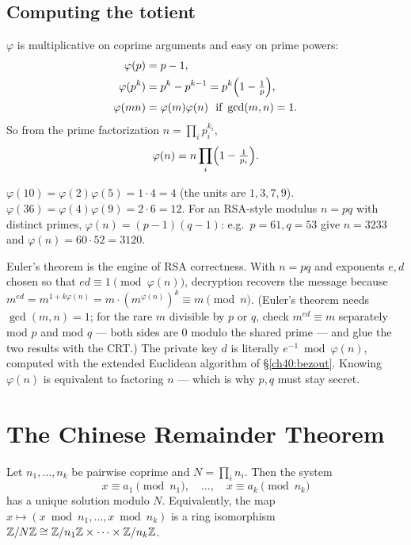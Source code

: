 \subsection{Computing the totient}
\label{ch40:totient}

$\varphi$ is multiplicative on coprime arguments and easy on prime powers:
\begin{align*}
  \varphi(p) &= p-1,\\
  \varphi(p^k) &= p^k - p^{k-1} = p^{k}\Bigl(1-\tfrac1p\Bigr),\\
  \varphi(mn) &= \varphi(m)\varphi(n)\ \text{ if } \gcd(m,n)=1.
\end{align*}
So from the prime factorization $n = \prod_i p_i^{k_i}$,
\[
  \varphi(n) = n\prod_{i}\Bigl(1 - \tfrac{1}{p_i}\Bigr).
\]

\begin{example}
\label{ch40:ex-totient}
$\varphi(10)=\varphi(2)\varphi(5)=1\cdot 4 = 4$ (the units are $1,3,7,9$). $\varphi(36)=\varphi(4)
\varphi(9)=2\cdot 6 = 12$. For an RSA-style modulus $n=pq$ with distinct primes, $\varphi(n) =
(p-1)(q-1)$: e.g.\ $p=61,q=53$ give $n=3233$ and $\varphi(n)=60\cdot 52 = 3120$.
\end{example}

\begin{applicationbox}
Euler's theorem is the engine of RSA correctness. With $n=pq$ and exponents $e,d$ chosen so that
$ed\equiv 1\pmod{\varphi(n)}$, decryption recovers the message because $m^{ed} = m^{1 + k\varphi(n)}
= m\cdot(m^{\varphi(n)})^k \equiv m\pmod n$. (Euler's theorem needs $\gcd(m,n)=1$; for the rare
$m$ divisible by $p$ or $q$, check $m^{ed}\equiv m$ separately mod $p$ and mod $q$ --- both sides are
$0$ modulo the shared prime --- and glue the two results with the CRT.) The private key $d$ is literally $e^{-1}\bmod
\varphi(n)$, computed with the extended Euclidean algorithm of \S\ref{ch40:bezout}. Knowing
$\varphi(n)$ is equivalent to factoring $n$ --- which is why $p,q$ must stay secret.
\end{applicationbox}

\section{The Chinese Remainder Theorem}
\label{ch40:crt}

\begin{theorem}[CRT]
\label{ch40:thm-crt}
Let $n_1,\dots,n_k$ be pairwise coprime and $N = \prod_i n_i$. Then the system
\[
  x \equiv a_1 \pmod{n_1},\quad \dots,\quad x \equiv a_k \pmod{n_k}
\]
has a unique solution modulo $N$. Equivalently, the map $x \mapsto (x\bmod n_1,\dots,x\bmod n_k)$ is
a ring isomorphism $\mathbb{Z}/N\mathbb{Z} \cong \mathbb{Z}/n_1\mathbb{Z}\times\cdots\times\mathbb{Z}/n_k\mathbb{Z}$.
\end{theorem}

